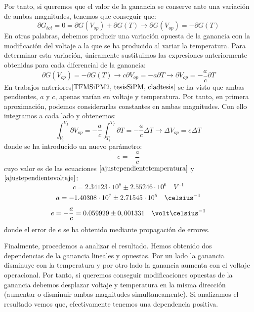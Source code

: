 Por tanto, si queremos que el valor de la ganancia se conserve ante una variación de ambas magnitudes, tenemos que conseguir que: 
\begin{equation}
\partial G_{tot} = 0 =  \partial G(V_{op}) + \partial G(T) \longrightarrow \partial G(V_{op}) = -\partial G(T)  
\label{basecompensacion}
\end{equation}
En otras palabras, debemos producir una  variación opuesta  de la ganancia con la modificación del voltaje a la que se ha producido al variar la temperatura. Para determinar esta variación, únicamente sustituimos las expresiones anteriormente obtenidas para cada diferencial de la ganancia:
\begin{equation}
\partial G(V_{op}) = - \partial G(T)  \longrightarrow c \partial V_{op}= - a \partial T \longrightarrow  \partial V_{op}= - \frac{a}{c} \partial T
\label{compensacionparciales}
\end{equation}
En trabajos anteriores$\cite{TFMSiPM2, tesisSiPM, cladtesis}$ se ha visto que ambas pendientes, $a$ y $c$, apenas varían en voltaje y temperatura. Por tanto, en primera aproximación, podemos considerarlas constantes en ambas magnitudes. Con ello integramos a cada lado y obtenemos:
\begin{equation}
\int_{V_i}^{V_f} \partial V_{op}= - \frac{a}{c} \int_{T_i}^{T_f}\partial T = - \frac{a}{c} \Delta T \longrightarrow \Delta V_{op}= e \Delta T
\label{integral}
\end{equation}
donde se ha introducido un nuevo parámetro: $$e=-\frac{a}{c}$$ cuyo valor es de las ecuaciones $\eqref{ajustependientetemperatura}$  y $\eqref{ajustependientevoltaje}$:
\begin{equation}
c=2.34123 \cdot 10^8 \pm 2.55246 \cdot 10^6 \quad V^{-1}
\label{pendientevoltaje}
\end{equation}
\begin{equation}
a=-1.40308 \cdot 10^7 \pm 2.71545 \cdot 10^5 \quad \celsius^{-1}
\label{pendientetemperatura}
\end{equation}
\begin{equation}
e=-\frac{a}{c} = 0.059929 \pm 0,001331 \quad \volt  \celsius^{-1}
\label{pendientecompensacion}
\end{equation}
donde el error de $e$ se ha obtenido mediante propagación de errores. 

Finalmente, procedemos a analizar el resultado. Hemos obtenido dos dependencias de la ganancia lineales y opuestas. Por un lado la ganancia disminuye con la temperatura y por otro lado la ganancia aumenta con el voltaje operacional. Por tanto, si queremos conseguir modificaciones opuestas de la ganancia debemos desplazar voltaje y temperatura en la misma dirección (aumentar o disminuir ambas magnitudes simultaneamente). Si analizamos el resultado vemos que, efectivamente tenemos una dependencia positiva.

